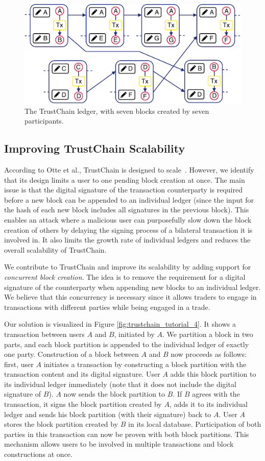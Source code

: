 \begin{figure}[t]
	\centering
	\includegraphics[width=.6\linewidth]{xchange/assets/trustchain}
	\caption{The TrustChain ledger, with seven blocks created by seven participants.}
	\label{fig:trustchain}
\end{figure}

\subsection{Improving TrustChain Scalability}
According to Otte et al., TrustChain is designed to scale~\cite{otte2017trustchain}.
However, we identify that its design limits a user to one pending block creation at once.
The main issue is that the digital signature of the transaction counterparty is required before a new block can be appended to an individual ledger (since the input for the hash of each new block includes all signatures in the previous block).
This enables an attack where a malicious user can purposefully slow down the block creation of others by delaying the signing process of a bilateral transaction it is involved in.
It also limits the growth rate of individual ledgers and reduces the overall scalability of TrustChain.

We contribute to TrustChain and improve its scalability by adding support for \emph{concurrent block creation}.
The idea is to remove the requirement for a digital signature of the counterparty when appending new blocks to an individual ledger.
We believe that this concurrency is necessary since it allows traders to engage in transactions with different parties while being engaged in a trade.

Our solution is visualized in Figure \ref{fig:trustchain_tutorial_4}.
It shows a transaction between users $ A $ and $ B $, initiated by $ A $.
We partition a block in two parts, and each block partition is appended to the individual ledger of exactly one party.
Construction of a block between $ A $ and $ B $ now proceeds as follows: first, user $ A $ initiates a transaction by constructing a block partition with the transaction content and its digital signature.
User $ A $ adds this block partition to its individual ledger immediately (note that it does not include the digital signature of $ B $).
$ A $ now sends the block partition to $ B $.
If $ B $ agrees with the transaction, it signs the block partition created by $ A $, adds it to its individual ledger and sends his block partition (with their signature) back to $ A $.
User $ A $ stores the block partition created by $ B $ in its local database.
Participation of both parties in this transaction can now be proven with both block partitions.
This mechanism allows users to be involved in multiple transactions and block constructions at once.

